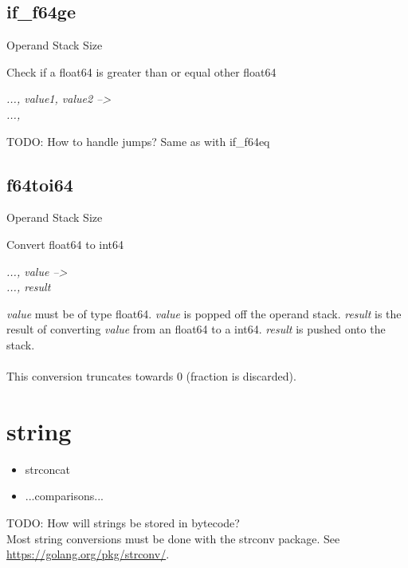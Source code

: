 \documentclass[12pt]{article}
\begin{document}
		\subsection*{if\_f64ge}
			\begin{labeling}{Operand Stack Size}
				\item [\textbf{Operation}] Check if a float64 is greater than or equal other float64
				\item [\textbf{Format}] 
				\item [\textbf{Operand Stack}] \textit{..., value1, value2 --\textgreater} \\
										\textit{..., }
				\item [\textbf{Description}] TODO: How to handle jumps? Same as with if\_f64eq
			\end{labeling}	
		\newpage
		\subsection*{f64toi64}
			\begin{labeling}{Operand Stack Size}
				\item [\textbf{Operation}] Convert float64 to int64
				\item [\textbf{Format}] 
				\item [\textbf{Operand Stack}] \textit{..., value --\textgreater} \\
										\textit{..., result}
				\item [\textbf{Description}] \textit{value} must be of type float64. \textit{value} is popped off the operand stack. \textit{result} is the result of converting \textit{value} from an float64 to a int64. \textit{result} is pushed onto the stack. \\ \\
				This conversion truncates towards 0 (fraction is discarded).  
			\end{labeling}	
		\newpage
	
	\section{string}
		\begin{itemize}
			\item strconcat
			\item ...comparisons...
		\end{itemize}
		TODO: How will strings be stored in bytecode? \\
		Most string conversions must be done with the \colorbox{code}{strconv} package. See \url{https://golang.org/pkg/strconv/}.
	
\end{document}
